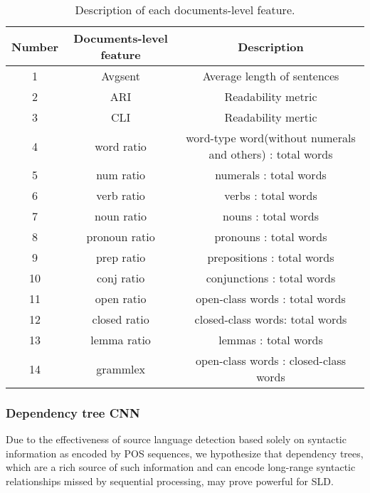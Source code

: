 \documentclass[twocolumn]{article}
\begin{document}
\begin{table*}
    \begin{center}     
        \begin{tabular}{c | c | c }
            Number & Documents-level feature & Description \\
            \hline
            1 & Avgsent & Average length of sentences \\
            2 & ARI & Readability metric \\
            3 & CLI & Readability mertic \\
            4 & word ratio & word-type word(without numerals and others) : total words \\
            5 & num ratio & numerals : total words \\
            6 & verb ratio & verbs : total words \\
            7 & noun ratio & nouns : total words \\
            8 & pronoun ratio & pronouns : total words \\
            9 & prep ratio & prepositions : total words \\
            10 & conj ratio & conjunctions : total words \\
            11 & open ratio & open-class words : total words \\
            12 & closed ratio & closed-class words: total words \\
            13 & lemma ratio & lemmas : total words \\
            14 & grammlex & open-class words : closed-class words \\
        \end{tabular}
        \caption{Description of each documents-level feature.}
        \label{fig:docs-level_features}
    \end{center}
\end{table*}

\subsubsection*{Dependency tree CNN}

Due to the effectiveness of source language detection based solely on syntactic information as encoded by POS sequences, we hypothesize that dependency trees, which are a rich source of such information and can encode long-range syntactic relationships missed by sequential processing, may prove powerful for SLD.
\end{document}
